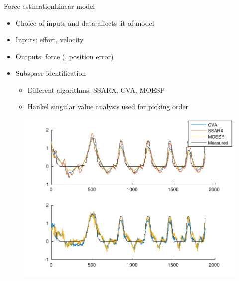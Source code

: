 \begin{frame}{Force estimation}{Linear model}
\begin{itemize}
  \item Choice of inputs and data affects fit of model
  \item Inputs: effort, velocity 
  \item Outputs: force (, position error)
  \item Subspace identification
	\begin{itemize}
	\item Different algorithms: SSARX, CVA, MOESP
	\item Hankel singular value analysis used for picking order
	\end{itemize}
\end{itemize}
	
	\begin{figure}
	\centering
	\includegraphics[width=\linewidth]{Billeder/sscomparison1-eps-converted-to.pdf}
	\end{figure}
\end{frame}
